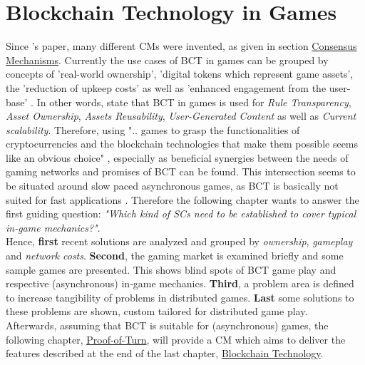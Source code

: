 
\chapter{Blockchain Technology in Games}
\label{chap:BlockchainInGames}
Since \citet{Nakamoto.2009}'s paper, many different \gls{CM}s were invented,
as given in section \hyperref[sec:ConsensusMechanisms]{Consensus Mechanisms}.
Currently the use cases of \gls{BCT} in games can be grouped by concepts of 'real-world ownership',
'digital tokens which represent game assets', the 'reduction of upkeep costs' as well as 'enhanced engagement from the user-base' \cite[15]{Laneve.2019}.
In other words, \citet[1]{Min.2019} state that \gls{BCT} in games is used for \textit{Rule Transparency},
\textit{Asset Ownership}, \textit{Assets Reusability}, \textit{User-Generated Content} as well as  \textit{Current scalability}.
Therefore, using ".. games to grasp the functionalities of cryptocurrencies and the blockchain technologies that make them possible seems like an obvious choice"
\cite[2]{Serada.2020}, especially as beneficial synergies between the needs of gaming networks and promises of \gls{BCT} can be found.
This intersection seems to be situated around slow paced asynchronous games, as \gls{BCT} is basically not suited for fast applications \cite[19]{Serada.2020}.
Therefore the following chapter wants to answer the first guiding question:
\textit{"Which kind of \gls{SC}s need to be established to cover typical in-game mechanics?"}. \\
Hence, \textbf{first} recent solutions are analyzed and grouped by \textit{ownership}, \textit{gameplay} and \textit{network costs}.
\textbf{Second}, the gaming market is examined briefly and some sample games are presented.
This shows blind spots of \gls{BCT} game play and respective (asynchronous) in-game mechanics.
\textbf{Third}, a problem area is defined to increase tangibility of problems in distributed games.
\textbf{Last} some solutions to these problems are shown, custom tailored for distributed game play. \\
Afterwards, assuming that \gls{BCT} is suitable for (asynchronous) games, the following chapter,
\hyperref[chap:PoT]{Proof-of-Turn}, will provide a \gls{CM} which aims to deliver
the features described at the end of the last chapter, \hyperref[chap:BCT]{Blockchain Technology}.

